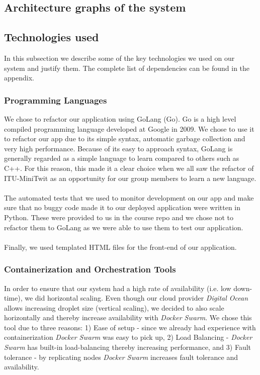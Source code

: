 \documentclass{article}
\begin{document}
\subsection{Architecture graphs of the system}

\subsection{Technologies used}
In this subsection we describe some of the key technologies we used on our system and justify them. The complete list of dependencies can be found in the appendix.

\subsubsection{Programming Languages}We chose to refactor our application using GoLang (Go). Go is a high level compiled programming language developed at Google in 2009. We chose to use it to refactor our app due to its simple syntax, automatic garbage collection and very high performance. Because of its easy to approach syntax, GoLang is generally regarded as a simple language to learn compared to others such as C++. For this reason, this made it a clear choice when we all saw the refactor of ITU-MiniTwit as an opportunity for our group members to learn a new language.
\\\\
The automated tests that we used to monitor development on our app and make sure that no buggy code made it to our deployed application were written in Python. These were provided to us in the course repo and we chose not to refactor them to GoLang as we were able to use them to test our application.
\\\\
Finally, we used templated HTML files for the front-end of our application.

\subsubsection{Containerization and Orchestration Tools}
In order to ensure that our system had a high rate of availability (i.e. low down-time), we did horizontal scaling. Even though our cloud provider \textit{Digital Ocean} allows increasing droplet size (vertical scaling), we decided to also scale horizontally and thereby increase availability with \textit{Docker Swarm}. We chose this tool due to three reasons: 1) Ease of setup - since we already had experience with containerization \textit{Docker Swarm} was easy to pick up, 2) Load Balancing - \textit{Docker Swarm} has built-in load-balancing thereby increasing performance, and 3) Fault tolerance - by replicating nodes \textit{Docker Swarm} increases fault tolerance and availability.
\end{document}
